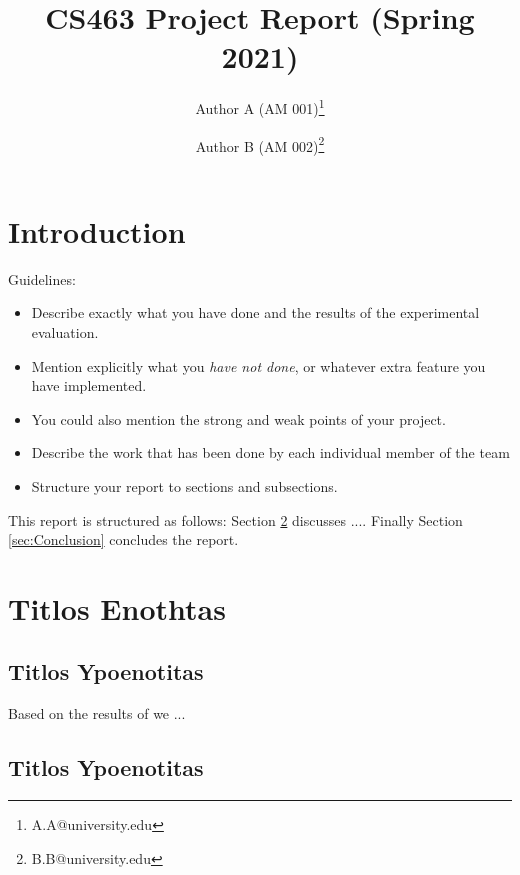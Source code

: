 \documentclass{article}
\begin{document}
\title{CS463 Project Report (Spring 2021)}

\author[1]{Author A (AM 001)\thanks{A.A@university.edu}}
\author[2]{Author B (AM 002)\thanks{B.B@university.edu}}



\maketitle



\section{Introduction}


Guidelines:
\begin{itemize}
 \item Describe exactly what you have done  and the results of the experimental evaluation.
\item  Mention explicitly what you {\em have not done}, or whatever extra feature you have implemented.
\item  You could also mention the strong and weak points of your project.
\item  Describe the work that has been done by each individual  member of the team
\item  Structure your report to sections and subsections.
\end{itemize}




This report is structured as follows:
Section \ref{sec:E} discusses ....
Finally
Section \ref{sec:Conclusion} concludes the report.


\section{Titlos Enothtas}
\label{sec:E}

\subsection{Titlos Ypoenotitas}


Based on the results of \cite{Rochio} we ...


\subsection{Titlos Ypoenotitas}
\end{document}
